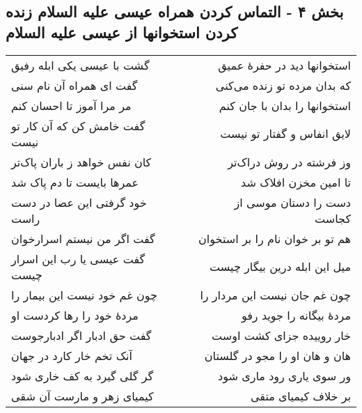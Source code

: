 \begin{center}
\section*{بخش ۴ - التماس کردن همراه عیسی علیه السلام زنده کردن استخوانها از عیسی علیه السلام}
\label{sec:sh004}
\begin{longtable}{l p{0.5cm} r}
گشت با عیسی یکی ابله رفیق
&&
استخوانها دید در حفرهٔ عمیق
\\
گفت ای همراه آن نام سنی
&&
که بدان مرده تو زنده می‌کنی
\\
مر مرا آموز تا احسان کنم
&&
استخوانها را بدان با جان کنم
\\
گفت خامش کن که آن کار تو نیست
&&
لایق انفاس و گفتار تو نیست
\\
کان نفس خواهد ز باران پاک‌تر
&&
وز فرشته در روش دراک‌تر
\\
عمرها بایست تا دم پاک شد
&&
تا امین مخزن افلاک شد
\\
خود گرفتی این عصا در دست راست
&&
دست را دستان موسی از کجاست
\\
گفت اگر من نیستم اسرارخوان
&&
هم تو بر خوان نام را بر استخوان
\\
گفت عیسی یا رب این اسرار چیست
&&
میل این ابله درین بیگار چیست
\\
چون غم خود نیست این بیمار را
&&
چون غم جان نیست این مردار را
\\
مردهٔ خود را رها کردست او
&&
مردهٔ بیگانه را جوید رفو
\\
گفت حق ادبار اگر ادبارجوست
&&
خار روییده جزای کشت اوست
\\
آنک تخم خار کارد در جهان
&&
هان و هان او را مجو در گلستان
\\
گر گلی گیرد به کف خاری شود
&&
ور سوی یاری رود ماری شود
\\
کیمیای زهر و مارست آن شقی
&&
بر خلاف کیمیای متقی
\\
\end{longtable}
\end{center}
